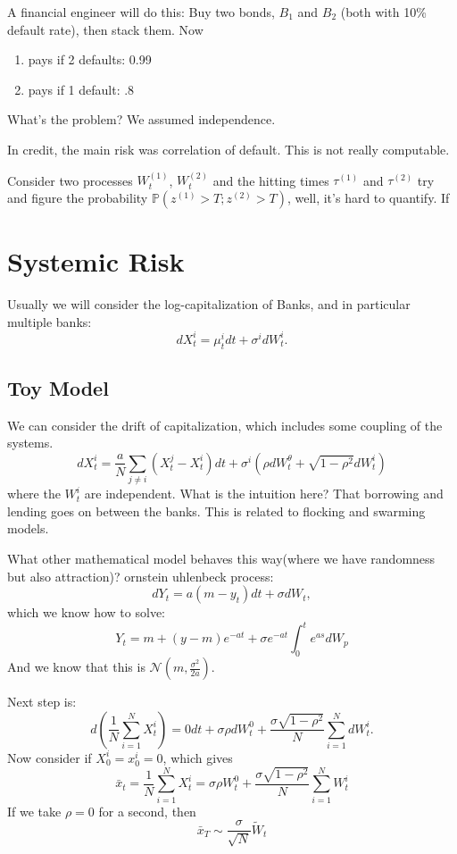 \documentclass[twocolumn,openany]{book}
\begin{document}
A financial engineer will do this: Buy two bonds, $B_1$ and $B_2$ (both with 10\% default rate), then stack them. Now
\begin{enumerate}
	\item pays if 2 defaults: 0.99
	\item pays if 1 default: .8
\end{enumerate}
What's the problem? We assumed independence.

In credit, the main risk was correlation of default. This is not really computable.

Consider two processes $W_t^{(1)}$, $W_t^{(2)}$ and the hitting times $\tau^{(1)}$ and $\tau^{(2)}$ try and figure the probability $\mathbb{P}(z^{(1)} > T; z^{(2)}> T)$, well, it's hard to quantify. If 

\section{Systemic Risk}
Usually we will consider the log-capitalization of Banks, and in particular multiple banks:
\begin{equation}
	dX_t^i = \mu_t^i dt + \sigma^i dW_t^i.
\end{equation}
\subsection{Toy Model}
We can consider the drift of capitalization, which includes some coupling of the systems.
\begin{equation}
	dX^i_t = \frac{a}{N} \sum_{j\ne i} (X^j_t - X_t^i)dt + \sigma^i (\rho dW_t^\theta + \sqrt{1-\rho^2} dW_t^i)
\end{equation}
where the $W^i_t$ are independent.
What is the intuition here? That borrowing and lending goes on between the banks. This is related to flocking and swarming models.

What other mathematical model behaves this way(where we have randomness but also attraction)? ornstein uhlenbeck process:
\begin{equation}
	dY_t = a(m-y_t)dt + \sigma dW_t,
\end{equation}
which we know how to solve:
\begin{equation}
	Y_t = m + (y-m)e^{-at} + \sigma e^{-at} \int_0^t e^{as}dW_p
\end{equation}
And we know that this is $\mathcal{N}(m, \frac{\sigma^2}{2a})$.

Next step is:
\begin{equation}
	d(\frac{1}{N} \sum_{i=1}^N X_t^i ) = 0 dt + \sigma \rho dW_t^0 + \frac{\sigma\sqrt{1-\rho^2}}{N} \sum_{i=1}^N dW_t^i.
\end{equation}
Now consider if $X_0^i=x_0^i=0$, which gives
\begin{equation}
	\bar{x}_t = \frac{1}{N}\sum_{i=1}^N X_t^i = \sigma \rho W_t^0 + \frac{\sigma \sqrt{1-\rho^2}}{N} \sum_{i=1}^N W_t^i
\end{equation}
If we take $\rho=0$ for a second, then
\begin{equation}
	\bar{x}_T \sim \frac{\sigma}{\sqrt{N}}\tilde{W}_t
\end{equation}
\end{document}
